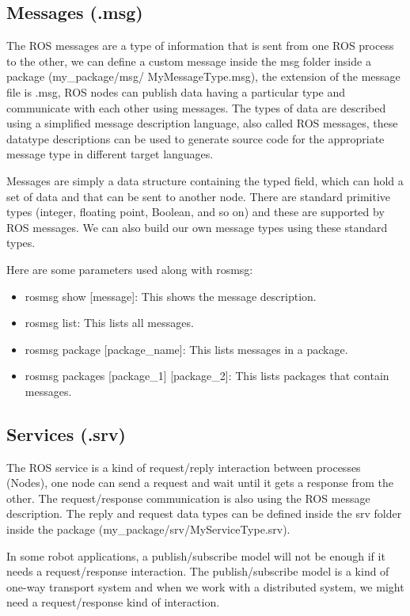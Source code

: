 	\subsection{Messages (.msg)}
	
	The ROS messages are a type of information that is sent from one ROS process to the other, we can define a custom message inside the msg folder inside a package (my\_package/msg/ MyMessageType.msg), the extension of the message file is .msg, ROS nodes can publish data having a particular type and communicate with each other using messages.
	The types of data are described using a simplified message description language, also called ROS messages, these datatype descriptions can be used to generate source code for the appropriate message type in different target languages.
	
	 Messages are simply a data structure containing the typed field, which can hold a set of data and that can be sent to another node. There are standard primitive types (integer, floating point, Boolean, and so on) and these are supported by ROS messages. We can also build our own message types using these standard types.
	 
	 Here are some parameters used along with rosmsg:
	 \begin{itemize}
	 	\item rosmsg show [message]: This shows the message description. 
	 	\item rosmsg list: This lists all messages. 
	 	\item rosmsg package [package\_name]: This lists messages in a package.
	 	\item rosmsg packages [package\_1] [package\_2]: This lists packages that contain messages.
	 \end{itemize}
 	\subsection{Services (.srv)}
 	The ROS service is a kind of request/reply interaction between processes (Nodes), one node can send a request and wait until it gets a response from the other.
 	The request/response communication is also using the ROS message description. 
 	The reply and request data types can be defined inside the srv folder inside the package (my\_package/srv/MyServiceType.srv).
 	
 	In some robot applications, a publish/subscribe model will not be enough if it needs a request/response interaction. The publish/subscribe model is a kind of one-way transport system and when we work with a distributed system, we might need a request/response kind of interaction.
 	
